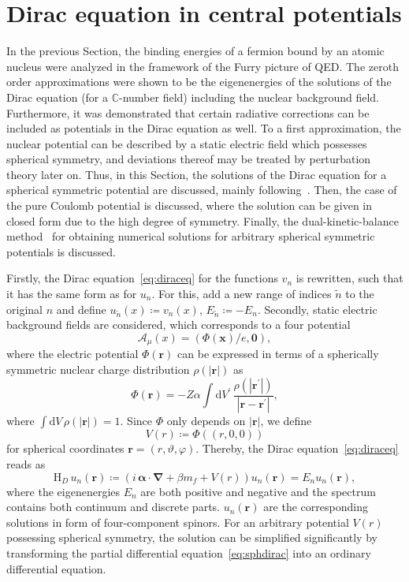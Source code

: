 \section{Dirac equation in central potentials}
\label{sec:sph_dirac}
In the previous Section, the binding energies of a fermion bound by an atomic nucleus were analyzed in the framework of the Furry picture of QED. The zeroth order approximations were shown to be the eigenenergies of the solutions of the Dirac equation (for a \mbox{$\mathbb{C}$-number} field) including the nuclear background field. Furthermore, it was demonstrated that certain radiative corrections can be included as potentials in the Dirac equation as well. To a first approximation, the nuclear potential can be described by a static electric field which possesses spherical symmetry, and deviations thereof may be treated by perturbation theory later on. Thus, in this Section, the solutions of the Dirac equation for a spherical symmetric potential are discussed, mainly following~\cite{greiner2000, weinberg2005}. Then, the case of the pure Coulomb potential is discussed, where the solution can be given in closed form due to the high degree of symmetry. Finally, the dual-kinetic-balance method~\cite{Shabaev2004} for obtaining numerical solutions for arbitrary spherical symmetric potentials is discussed.

Firstly, the Dirac equation~\eqref{eq:diraceq} for the functions $v_n$ is rewritten, such that it has the same form as for $u_n$. For this, add a new range of indices $\tilde{n}$ to the original $n$ and define $u_{\tilde{n}}(x)\coloneqq v_n(x)$, $E_{\tilde{n}}\coloneqq -E_n$. Secondly, static electric background fields are considered, which corresponds to a four potential
\begin{equation}
\mathcal{A}_\mu(x)=(\Phi(\mathbf{x})/e,\mathbf{0}),
\end{equation}
where the electric potential $\Phi(\mathbf{r})$ can be expressed in terms of a spherically symmetric nuclear charge distribution $\rho(\mathbf{|r|})$ as
\begin{equation}
\label{eq:furry_elPot}
\Phi(\mathbf{r})=-Z\alpha\int\mathrm{d}V^{\prime}\,\frac{\rho(|\mathbf{r^{\prime}}|)}{|\mathbf{r}-\mathbf{r^{\prime}}|},
\end{equation}
where $\int \mathrm{d}V\,\rho(|\mathbf{r}|)=1$. Since $\Phi$ only depends on $|\mathbf{r}|$, we define $$V(r)\coloneqq \Phi((r,0,0))\label{eq:FSpot}$$ for spherical coordinates $\mathbf{r}=(r,\vartheta,\varphi)$. Thereby, the Dirac equation~\eqref{eq:diraceq} reads as
\begin{equation}
\text{H}_D \, u_n(\mathbf{r})\coloneqq\left( i\,\pmb{\alpha} \cdot \mathbf{\nabla} + \beta m_f + V(r) \right) u_n(\mathbf{r}) =  E_n u_n(\mathbf{r}),
\label{eq:sphdirac}
\end{equation}
where the eigenenergies $E_n$ are both positive and negative and the spectrum contains both continuum and discrete parts. $u_n(\mathbf{r})$ are the corresponding solutions in form of four-component spinors. For an arbitrary potential $V(r)$ possessing spherical symmetry, the solution can be simplified significantly by transforming the partial differential equation~\eqref{eq:sphdirac} into an ordinary differential equation.

